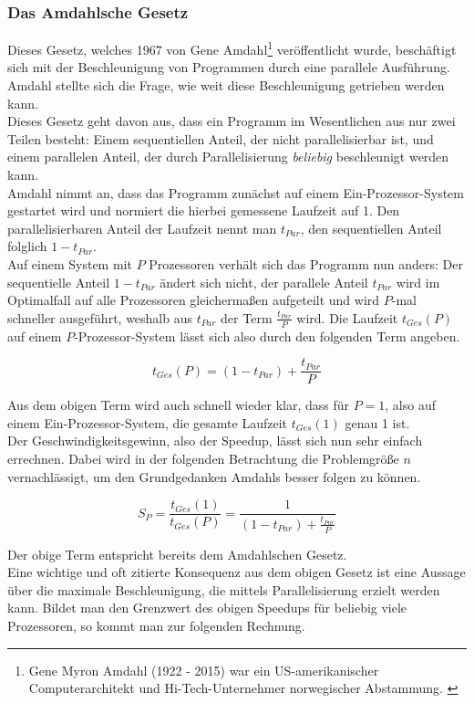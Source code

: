 			\subsubsection{Das Amdahlsche Gesetz}
			
				Dieses Gesetz, welches 1967 von Gene Amdahl\footnote{Gene Myron Amdahl (1922 - 2015) war ein US-amerikanischer Computerarchitekt und Hi-Tech-Unternehmer norwegischer Abstammung. \cite{GeneAmdahlWikipedia}} veröffentlicht wurde, beschäftigt sich mit der Beschleunigung von Programmen durch eine parallele Ausführung. Amdahl stellte sich die Frage, wie weit diese Beschleunigung getrieben werden kann.\\
				Dieses Gesetz geht davon aus, dass ein Programm im Wesentlichen aus nur zwei Teilen besteht: Einem sequentiellen Anteil, der nicht parallelisierbar ist, und einem parallelen Anteil, der durch Parallelisierung \textit{beliebig} beschleunigt werden kann.\\
				Amdahl nimmt an, dass das Programm zunächst auf einem Ein-Prozessor-System gestartet wird und normiert die hierbei gemessene Laufzeit auf 1. Den parallelisierbaren Anteil der Laufzeit nennt man $t_{Par}$, den sequentiellen Anteil folglich $1 - t_{Par}$.\\
				Auf einem System mit $P$ Prozessoren verhält sich das Programm nun anders: Der sequentielle Anteil $1 - t_{Par}$ ändert sich nicht, der parallele Anteil $t_{Par}$ wird im Optimalfall auf alle Prozessoren gleichermaßen aufgeteilt und wird $P$-mal schneller ausgeführt, weshalb aus $t_{Par}$ der Term $\frac{t_{Par}}{P}$ wird. Die Laufzeit $t_{Ges}(P)$ auf einem $P$-Prozessor-System lässt sich also durch den folgenden Term angeben.
				
				\[ t_{Ges}(P) = (1 - t_{Par}) + \frac{t_{Par}}{P} \]
			
				Aus dem obigen Term wird auch schnell wieder klar, dass für $P = 1$, also auf einem Ein-Prozessor-System, die gesamte Laufzeit $t_{Ges}(1)$ genau 1 ist.\\
				Der Geschwindigkeitsgewinn, also der Speedup, lässt sich nun sehr einfach errechnen. Dabei wird in der folgenden Betrachtung die Problemgröße $n$ vernachlässigt, um den Grundgedanken Amdahls besser folgen zu können.
				
				\[ S_P = \frac{t_{Ges}(1)}{t_{Ges}(P)} = \frac{1}{(1 - t_{Par}) + \frac{t_{Par}}{P}} \]
			
				Der obige Term entspricht bereits dem Amdahlschen Gesetz.\\
				Eine wichtige und oft zitierte Konsequenz aus dem obigen Gesetz ist eine Aussage über die maximale Beschleunigung, die mittels Parallelisierung erzielt werden kann. Bildet man den Grenzwert des obigen Speedups für beliebig viele Prozessoren, so kommt man zur folgenden Rechnung.
				

